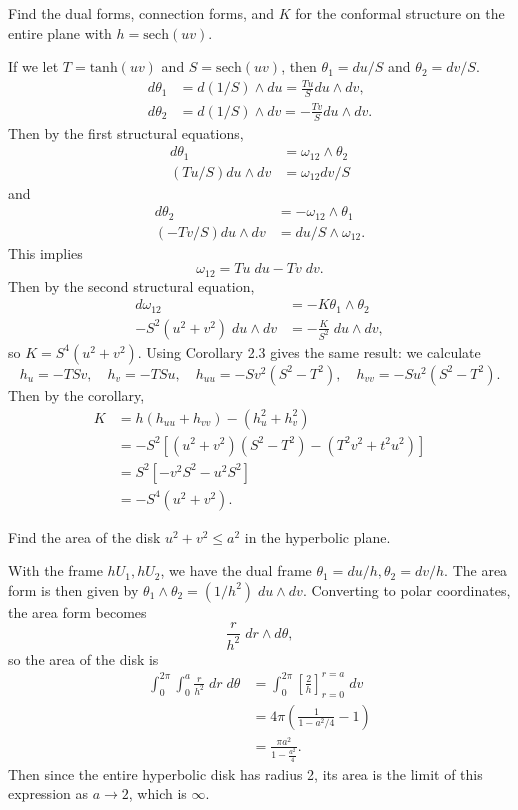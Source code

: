 \documentclass[10pt]{report}
\begin{document}
\pagebreak
\begin{exer}[7.2: 2]
	Find the dual forms, connection forms, and $K$ for the conformal structure on the entire plane with $h = \text{sech}(uv)$.
\end{exer}
If we let $T = \text{tanh}(uv)$ and $S = \text{sech}(uv)$, then $\theta_1 = du/S$ and $\theta_2 = dv/S$.
\begin{align*}
	d\theta_1 &= d(1/S) \wedge du = \frac{T u}{S} du\wedge dv, \\
	d\theta_2 &= d(1/S) \wedge dv = -\frac{T v}{S} du\wedge dv.
\end{align*}
Then by the first structural equations,
\begin{align*}
	d\theta_1 &= \omega_{12}\wedge \theta_2 \\
	(Tu/S)du \wedge dv &= \omega_{12} dv/S
\end{align*}
and
\begin{align*}
	d\theta_2 &= -\omega_{12} \wedge \theta_1 \\
	(-Tv/S) du \wedge dv &= du/S \wedge \omega_{12}.
\end{align*}
This implies
\[
\omega_{12} = Tu \;du - Tv\;dv.
\] 
Then by the second structural equation,
\begin{align*}
	d\omega_{12}&=-K\theta_1\wedge \theta_2 \\
	-S^2(u^2+v^2)\;du \wedge dv &= -\frac{K}{S^2} \;du \wedge dv,
\end{align*}
so $K = S^4(u^2+v^2)$. Using Corollary 2.3 gives the same result: we calculate
\[
	h_{u}=-TSv, \quad h_{v}=-TSu, \quad h_{uu}=-Sv^2(S^2-T^2), \quad h_{vv}=-Su^2(S^2-T^2).
\] Then by the corollary,
\begin{align*}
	K &= h(h_{uu}+h_{vv}) - (h_{u}^2+h_{v}^2) \\
	  &= -S^2 \left[ (u^2+v^2)(S^2-T^2)-(T^2v^2 + t^2u^2) \right]\\
	  &= S^2 \left[ -v^2S^2 - u^2S^2 \right] \\
	  &= -S^4 (u^2+v^2).
\end{align*}

\pagebreak
\begin{exer}[7.2: 3]
	Find the area of the disk $u^2+v^2 \leq a^2$ in the hyperbolic plane.
\end{exer}
With the frame $hU_1, hU_2$, we have the dual frame $\theta_1 = du/h, \theta_2=dv/h$. The area form is then given by $\theta_1 \wedge \theta_2 = (1/h^2) \;du\wedge dv$. Converting to polar coordinates, the area form becomes
\[
\frac{r}{h^2}\; dr \wedge d\theta,
\] so the area of the disk is
\begin{align*}
	\int_{0}^{2\pi} \int_{0}^{a} \frac{r}{h^2} \;dr\;d\theta &= \int_{0}^{2\pi} \left[ \frac{2}{h}  \right]^{r=a}_{r=0}\;dv \\
								 &= 4\pi\left( \frac{1}{1-a^2/4} -1 \right) \\
								 &= \frac{\pi a^2}{1-\frac{a^2}{4} } .
\end{align*}
Then since the entire hyperbolic disk has radius 2, its area is the limit of this expression as $a \to 2$, which is $\infty$.
\end{document}
